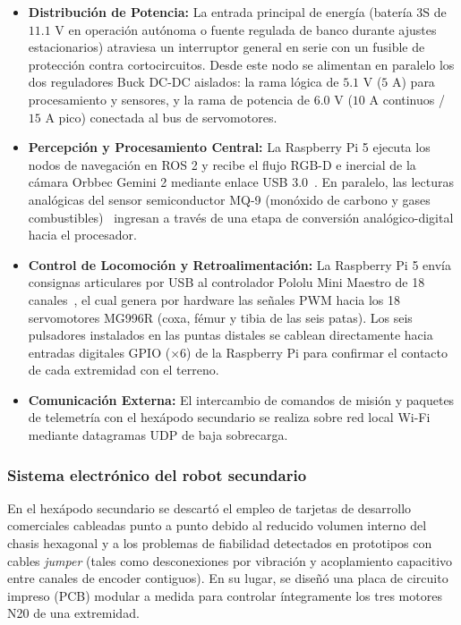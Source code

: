 \begin{itemize}
    \item \textbf{Distribución de Potencia:} La entrada principal de energía (batería $3\text{S}$ de $11.1\text{ V}$ en operación autónoma o fuente regulada de banco durante ajustes estacionarios) atraviesa un interruptor general en serie con un fusible de protección contra cortocircuitos. Desde este nodo se alimentan en paralelo los dos reguladores Buck DC-DC aislados: la rama lógica de $5.1\text{ V}$ ($5\text{ A}$) para procesamiento y sensores, y la rama de potencia de $6.0\text{ V}$ ($10\text{ A}$ continuos / $15\text{ A}$ pico) conectada al bus de servomotores.
    \item \textbf{Percepción y Procesamiento Central:} La Raspberry Pi 5 ejecuta los nodos de navegación en ROS 2 y recibe el flujo RGB-D e inercial de la cámara Orbbec Gemini 2 mediante enlace USB 3.0~\cite{RaspberryPi5_Datasheet, Orbbec_Gemini2_Datasheet}. En paralelo, las lecturas analógicas del sensor semiconductor MQ-9 (monóxido de carbono y gases combustibles)~\cite{MQ9_Datasheet} ingresan a través de una etapa de conversión analógico-digital hacia el procesador.
    \item \textbf{Control de Locomoción y Retroalimentación:} La Raspberry Pi 5 envía consignas articulares por USB al controlador Pololu Mini Maestro de 18 canales~\cite{Pololu_Maestro_Datasheet}, el cual genera por hardware las señales PWM hacia los 18 servomotores MG996R (coxa, fémur y tibia de las seis patas). Los seis pulsadores instalados en las puntas distales se cablean directamente hacia entradas digitales GPIO ($\times 6$) de la Raspberry Pi para confirmar el contacto de cada extremidad con el terreno.
    \item \textbf{Comunicación Externa:} El intercambio de comandos de misión y paquetes de telemetría con el hexápodo secundario se realiza sobre red local Wi-Fi mediante datagramas UDP de baja sobrecarga.
\end{itemize}

\subsubsection{Sistema electrónico del robot secundario}

En el hexápodo secundario se descartó el empleo de tarjetas de desarrollo comerciales cableadas punto a punto debido al reducido volumen interno del chasis hexagonal y a los problemas de fiabilidad detectados en prototipos con cables \textit{jumper} (tales como desconexiones por vibración y acoplamiento capacitivo entre canales de encoder contiguos). En su lugar, se diseñó una placa de circuito impreso (PCB) modular a medida para controlar íntegramente los tres motores N20 de una extremidad.

